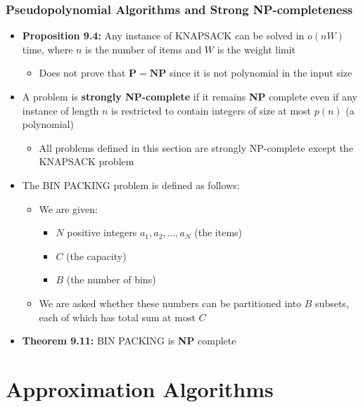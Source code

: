 \documentclass[11pt]{article}
\begin{document}
\subsubsection{Pseudopolynomial Algorithms and Strong NP-completeness}
\label{sec:org8bc8dae}
\begin{itemize}
\item \textbf{Proposition 9.4:} Any instance of KNAPSACK can be solved in \(o(nW)\) time, where \(n\) is the number of items and \(W\) is the weight limit	
\begin{itemize}
\item Does not prove that \(\mathbf P=\mathbf{NP}\) since it is not polynomial in the input size
\end{itemize}

\item A problem is \textbf{strongly NP-complete} if it remains \textbf{NP} complete even if any instance of length \(n\) is restricted to contain integers of size at most \(p(n)\) (a polynomial)
\begin{itemize}
\item All problems defined in this section are strongly NP-complete except the KNAPSACK problem
\end{itemize}

\item The BIN PACKING problem is defined as follows: 
\begin{itemize}
\item We are given:
\begin{itemize}
\item \(N\) positive integers \(a_1, a_2, \dots, a_N\) (the items)
\item \(C\) (the capacity)
\item \(B\) (the number of bins)
\end{itemize}
\item We are asked whether these numbers can be partitioned into \(B\) subsets, each of which has total sum at most \(C\)
\end{itemize}

\item \textbf{Theorem 9.11:} BIN PACKING is \textbf{NP} complete
\end{itemize}

\section{Approximation Algorithms}
\label{sec:orgc40302e}
\end{document}
